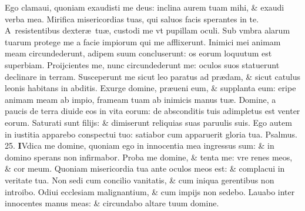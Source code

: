 \documentclass[a5paper,10pt]{book}
\def\ae{æ}
\begin{document}
\begin{multicols*}{2}
\newline \color{red} E\color{black}go clamaui, quoniam exaudisti me deus: inclina aurem tuam mihi, \& exaudi verba mea.
\newline \color{red} M\color{black}irifica misericordias tuas, qui saluos facis sperantes in te.
\newline \color{red} A\color{black}\ resistentibus dexter\ae \ tu\ae , custodi me vt pupillam oculi.
\newline \color{red} S\color{black}ub vmbra alarum tuarum protege me a facie impiorum qui me afflixerunt.
\newline \color{red} I\color{black}nimici mei animam meam circundederunt, adipem suum concluserunt: os eorum loquutum est superbiam.
\newline \color{red} P\color{black}roijcientes me, nunc circundederunt me: oculos suos statuerunt declinare in terram.
\newline \color{red} S\color{black}usceperunt me sicut leo paratus ad pr\ae dam, \& sicut catulus leonis habitans in abditis.
\newline \color{red} E\color{black}xurge domine, pr\ae ueni eum, \& supplanta eum: eripe animam meam ab impio, frameam tuam ab inimicis manus tu\ae .
\newline \color{red} D\color{black}omine, a paucis de terra diuide eos in vita eorum: de absconditis tuis adimpletus est venter eorum.
\newline \color{red} S\color{black}aturati sunt filijs: \& dimiserunt reliquias suas paruulis suis.
\newline \color{red} E\color{black}go autem in iustitia apparebo conspectui tuo: satiabor cum apparuerit gloria tua. \quad \color{red} Psalmus. \hypertarget{ps25}{25.} \color{black}
\vspace{-.5em}
\lettrine[lines=2]{\bfseries \color{red} I}{}Vdica me domine, quoniam ego in innocentia mea ingressus sum: \& in domino sperans non infirmabor.
\newline \color{red} P\color{black}roba me domine, \& tenta me: vre renes meos, \& cor meum.
\newline \color{red} Q\color{black}uoniam misericordia tua ante oculos meos est: \& complacui in veritate tua.
\newline \color{red} N\color{black}on sedi cum concilio vanitatis, \& cum iniqua gerentibus non introibo.
\newline \color{red} O\color{black}diui ecclesiam malignantium, \& cum impijs non sedebo.
\newline \color{red} L\color{black}auabo inter innocentes manus meas: \& circundabo altare tuum domine.

\end{multicols*}
\end{document}
